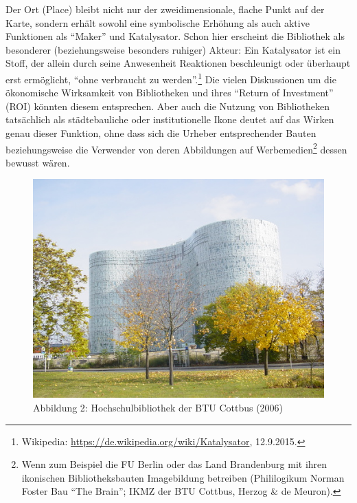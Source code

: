 Der Ort (Place) bleibt nicht nur der zweidimensionale, flache Punkt auf
der Karte, sondern erhält sowohl eine symbolische Erhöhung als auch
aktive Funktionen als \enquote{Maker} und Katalysator. Schon hier
erscheint die Bibliothek als besonderer (beziehungsweise besonders
ruhiger) Akteur: Ein Katalysator ist ein Stoff, der allein durch seine
Anwesenheit Reaktionen beschleunigt oder überhaupt erst ermöglicht,
\enquote{ohne verbraucht zu werden}.\footnote{Wikipedia:
  \url{https://de.wikipedia.org/wiki/Katalysator}, 12.9.2015.} Die
vielen Diskussionen um die ökonomische Wirksamkeit von Bibliotheken und
ihres \enquote{Return of Investment} (ROI) könnten diesem entsprechen.
Aber auch die Nutzung von Bibliotheken tatsächlich als städtebauliche
oder institutionelle Ikone deutet auf das Wirken genau dieser Funktion,
ohne dass sich die Urheber entsprechender Bauten beziehungsweise die
Verwender von deren Abbildungen auf Werbemedien\footnote{Wenn zum
  Beispiel die FU Berlin oder das Land Brandenburg mit ihren ikonischen
  Bibliotheksbauten Imagebildung betreiben (Phililogikum Norman Foster
  Bau \enquote{The Brain}; IKMZ der BTU Cottbus, Herzog \& de Meuron).}
dessen bewusst wären.

\begin{figure}[htbp]
\centering
\includegraphics{img/hobohm-2.jpg}
\caption{Abbildung 2: Hochschulbibliothek der BTU Cottbus (2006)}
\end{figure}

